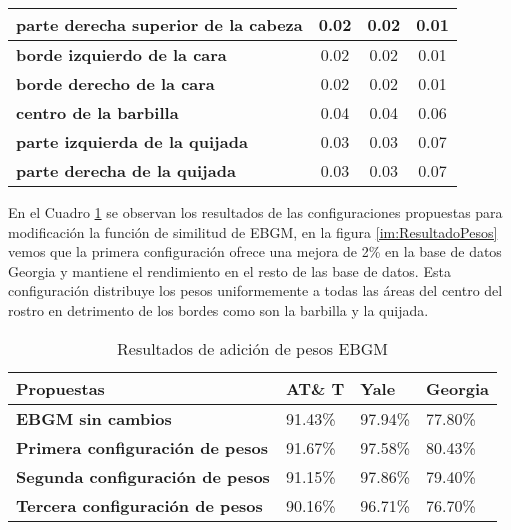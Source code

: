\begin{table}[h]
{\begin{tabular}{|l|c|c|c|}
\textbf{parte derecha superior de la cabeza}   & 0.02                                      & 0.02                                     & 0.01                                                                         \\ \hline
\textbf{borde izquierdo de la cara}            & 0.02                                      & 0.02                                     & 0.01                                                                         \\ \hline
\textbf{borde derecho de la cara}              & 0.02                                      & 0.02                                     & 0.01                                                                         \\ \hline
\textbf{centro de la barbilla}                 & 0.04                                      & 0.04                                     & 0.06                                                                         \\ \hline
\textbf{parte izquierda de la quijada}         & 0.03                                      & 0.03                                     & 0.07                                                                         \\ \hline
\textbf{parte derecha de la quijada}           & 0.03                                      & 0.03                                     & 0.07                                                                         \\ \hline
\end{tabular}
}
\end{table}

En el Cuadro \ref{ta:ResultadosPesos} se observan los resultados de las configuraciones propuestas para modificación la función de similitud de \ac{EBGM}, en la figura \ref{im:ResultadoPesos} vemos que la primera configuración ofrece una mejora de 2\% en la base de datos Georgia y mantiene el rendimiento en el resto de las base de datos. Esta configuración distribuye los pesos uniformemente a todas las áreas del centro del rostro en detrimento de los bordes como son la barbilla y la quijada.

\begin{table}[h]
\centering
\caption{Resultados de adición de pesos \ac{EBGM}}
\label{ta:ResultadosPesos}
\begin{tabular}{|l|l|l|l|}
\hline
\textbf{Propuestas}                     & \textbf{AT\& T} & \textbf{Yale} & \textbf{Georgia} \\ \hline
\textbf{\ac{EBGM} sin cambios}             & 91.43\%      & 97.94\%       & 77.80\%          \\ \hline
\textbf{Primera configuración de pesos} & 91.67\%      & 97.58\%       & 80.43\%          \\ \hline
\textbf{Segunda configuración de pesos} & 91.15\%      & 97.86\%       & 79.40\%          \\ \hline
\textbf{Tercera configuración de pesos} & 90.16\%      & 96.71\%       & 76.70\%          \\ \hline
\end{tabular}
\end{table}

